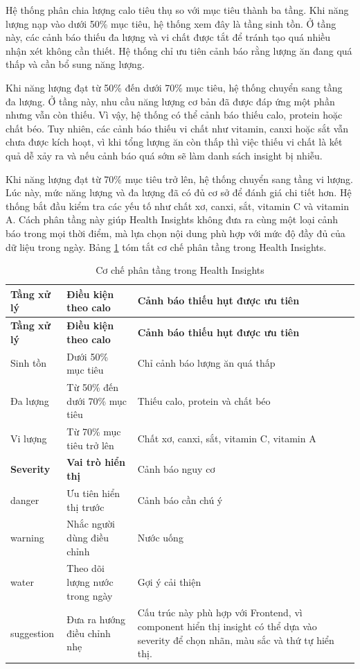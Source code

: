 \documentclass[12pt, a4paper]{report}
\begin{document}
Hệ thống phân chia lượng calo tiêu thụ so với mục tiêu thành ba tầng. Khi năng lượng nạp vào dưới 50\% mục tiêu, hệ thống xem đây là tầng sinh tồn. Ở tầng này, các cảnh báo thiếu đa lượng và vi chất được tắt để tránh tạo quá nhiều nhận xét không cần thiết. Hệ thống chỉ ưu tiên cảnh báo rằng lượng ăn đang quá thấp và cần bổ sung năng lượng.

Khi năng lượng đạt từ 50\% đến dưới 70\% mục tiêu, hệ thống chuyển sang tầng đa lượng. Ở tầng này, nhu cầu năng lượng cơ bản đã được đáp ứng một phần nhưng vẫn còn thiếu. Vì vậy, hệ thống có thể cảnh báo thiếu calo, protein hoặc chất béo. Tuy nhiên, các cảnh báo thiếu vi chất như vitamin, canxi hoặc sắt vẫn chưa được kích hoạt, vì khi tổng lượng ăn còn thấp thì việc thiếu vi chất là kết quả dễ xảy ra và nếu cảnh báo quá sớm sẽ làm danh sách insight bị nhiễu.

Khi năng lượng đạt từ 70\% mục tiêu trở lên, hệ thống chuyển sang tầng vi lượng. Lúc này, mức năng lượng và đa lượng đã có đủ cơ sở để đánh giá chi tiết hơn. Hệ thống bắt đầu kiểm tra các yếu tố như chất xơ, canxi, sắt, vitamin C và vitamin A. Cách phân tầng này giúp Health Insights không đưa ra cùng một loại cảnh báo trong mọi thời điểm, mà lựa chọn nội dung phù hợp với mức độ đầy đủ của dữ liệu trong ngày. Bảng \ref{tab:health_insights_layers} tóm tắt cơ chế phân tầng trong Health Insights.
\begin{longtable}{|>{\raggedright\arraybackslash}p{4cm}|>{\raggedright\arraybackslash}p{4cm}|p{7cm}|}
\caption{Cơ chế phân tầng trong Health Insights}
\label{tab:health_insights_layers} \\
\hline
\textbf{Tầng xử lý} & \textbf{Điều kiện theo calo} & \textbf{Cảnh báo thiếu hụt được ưu tiên} \\
\hline
\endfirsthead
\hline
\textbf{Tầng xử lý} & \textbf{Điều kiện theo calo} & \textbf{Cảnh báo thiếu hụt được ưu tiên} \\
\hline
\endhead

Sinh tồn & Dưới 50\% mục tiêu & Chỉ cảnh báo lượng ăn quá thấp \\
\hline
Đa lượng & Từ 50\% đến dưới 70\% mục tiêu & Thiếu calo, protein và chất béo \\
\hline
Vi lượng & Từ 70\% mục tiêu trở lên & Chất xơ, canxi, sắt, vitamin C, vitamin A \\
\hline
\textbf{Severity} & \textbf{Vai trò hiển thị} & Cảnh báo nguy cơ \\
\hline
danger & Ưu tiên hiển thị trước & Cảnh báo cần chú ý \\
\hline
warning & Nhắc người dùng điều chỉnh & Nước uống \\
\hline
water & Theo dõi lượng nước trong ngày & Gợi ý cải thiện \\
\hline
suggestion & Đưa ra hướng điều chỉnh nhẹ & Cấu trúc này phù hợp với Frontend, vì component hiển thị insight có thể dựa vào severity để chọn nhãn, màu sắc và thứ tự hiển thị. \\
\hline
\end{longtable}
\end{document}
